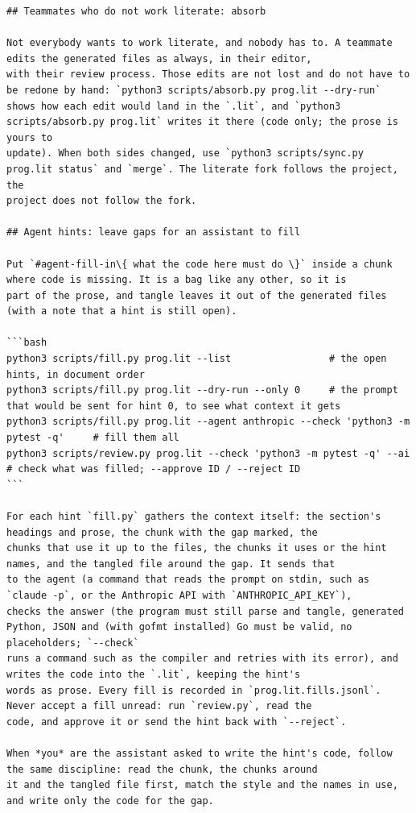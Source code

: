 \documentclass[10pt,a4paper]{article}
\newcounter{chunk}
\begin{document}
\begin{Verbatim}
## Teammates who do not work literate: absorb

Not everybody wants to work literate, and nobody has to. A teammate edits the generated files as always, in their editor,
with their review process. Those edits are not lost and do not have to be redone by hand: `python3 scripts/absorb.py prog.lit --dry-run`
shows how each edit would land in the `.lit`, and `python3 scripts/absorb.py prog.lit` writes it there (code only; the prose is yours to
update). When both sides changed, use `python3 scripts/sync.py prog.lit status` and `merge`. The literate fork follows the project, the
project does not follow the fork.

## Agent hints: leave gaps for an assistant to fill

Put `#agent-fill-in\{ what the code here must do \}` inside a chunk where code is missing. It is a bag like any other, so it is
part of the prose, and tangle leaves it out of the generated files (with a note that a hint is still open).

```bash
python3 scripts/fill.py prog.lit --list                 # the open hints, in document order
python3 scripts/fill.py prog.lit --dry-run --only 0     # the prompt that would be sent for hint 0, to see what context it gets
python3 scripts/fill.py prog.lit --agent anthropic --check 'python3 -m pytest -q'     # fill them all
python3 scripts/review.py prog.lit --check 'python3 -m pytest -q' --ai                # check what was filled; --approve ID / --reject ID
```

For each hint `fill.py` gathers the context itself: the section's headings and prose, the chunk with the gap marked, the
chunks that use it up to the files, the chunks it uses or the hint names, and the tangled file around the gap. It sends that
to the agent (a command that reads the prompt on stdin, such as `claude -p`, or the Anthropic API with `ANTHROPIC_API_KEY`),
checks the answer (the program must still parse and tangle, generated Python, JSON and (with gofmt installed) Go must be valid, no placeholders; `--check`
runs a command such as the compiler and retries with its error), and writes the code into the `.lit`, keeping the hint's
words as prose. Every fill is recorded in `prog.lit.fills.jsonl`. Never accept a fill unread: run `review.py`, read the
code, and approve it or send the hint back with `--reject`.

When *you* are the assistant asked to write the hint's code, follow the same discipline: read the chunk, the chunks around
it and the tangled file first, match the style and the names in use, and write only the code for the gap.


\end{Verbatim}
\end{document}
